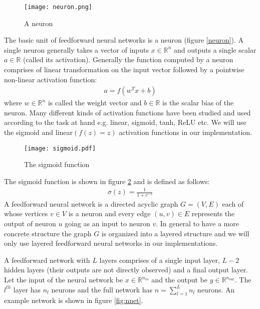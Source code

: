 \begin{figure}[ht]
\begin{center}
\centerline{\texttt{[image: neuron.png]}}
\caption{A neuron}
\label{fig:neuron}
\end{center}
\vskip -0.2in
\end{figure}

The basic unit of feedforward neural networks is a neuron (figure \ref{neuron}). A single neuron generally takes a vector of inputs $x \in \mathbb{R}^n$ and outputs a single scalar $a \in \mathbb{R}$ (called its activation). Generally the function computed by a neuron comprises of linear transformation on the input vector followed by a pointwise non-linear activation function:
\begin{align}
a = f(w^T x + b)
\end{align}
where $w \in \mathbb{R}^n$ is called the weight vector and $b \in \mathbb{R}$ is the scalar bias of the neuron.
Many different kinds of activation functions have been studied and used according to the task at hand e.g. linear, sigmoid, tanh, ReLU etc. We will use the sigmoid and linear$(f(z) = z)$ activation functions in our implementation.

\begin{figure}[ht]
\begin{center}
\centerline{\texttt{[image: sigmoid.pdf]}}
\caption{The sigmoid function}
\label{fig:sigmoid}
\end{center}
\vskip -0.2in
\end{figure}

The sigmoid function is shown in figure \ref{fig:sigmoid} and is defined as follows:
\begin{align}
\sigma(z) = \frac{1}{1 + e^{-z}}
\end{align}
A feedforward neural network is a directed acyclic graph $G = (V,E)$ each of whose vertices $v \in V$ is a neuron and every edge $(u,v) \in E$ represents the output of neuron $u$ going as an input to neuron $v$. In general to have a more concrete structure the graph $G$ is organized into a layered structure and we will only use layered feedforward neural networks in our implementations. 

A feedforward network with $L$ layers comprises of a single input layer, $L-2$ hidden layers (their outputs are not directly observed) and a final output layer.
Let the input of the neural network be $x \in \mathbb{R}^{n_{in}}$ and the output be $y \in \mathbb{R}^{n_{out}}$.
The $l^{th}$ layer has $n_l$ neurons and the full network has $n = \sum_{l=1}^L n_l$ neurons. 
An example network is shown in figure \ref{fig:nnet}.

